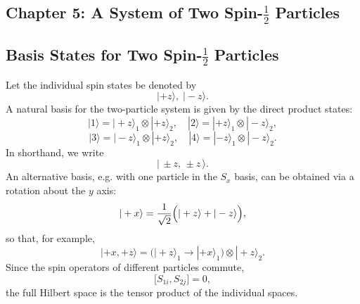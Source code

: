\documentclass[twocolumn]{article}
\begin{document}
\begin{spacing}{1}
\section{Chapter 5: A System of Two Spin-\(\frac{1}{2}\) Particles}

\subsection{Basis States for Two Spin-\(\frac{1}{2}\) Particles}
Let the individual spin states be denoted by
\[
|+z\rangle,\;|-z\rangle.
\]
A natural basis for the two-particle system is given by the direct product states:
\[
|1\rangle=|+z\rangle_1\otimes|+z\rangle_2,\quad
|2\rangle=|+z\rangle_1\otimes|-z\rangle_2,
\]
\[
|3\rangle=|-z\rangle_1\otimes|+z\rangle_2,\quad
|4\rangle=|-z\rangle_1\otimes|-z\rangle_2.
\]
In shorthand, we write
\[
|\,\pm z,\,\pm z\,\rangle.
\]
An alternative basis, e.g. with one particle in the \(S_x\) basis, can be obtained via a rotation about the \(y\) axis:
\[
|+x\rangle=\frac{1}{\sqrt{2}}\Bigl(|+z\rangle+|-z\rangle\Bigr),
\]
so that, for example,
\[
|+x,+z\rangle = \bigl(|+z\rangle_1\to|+x\rangle_1\bigr)\otimes|+z\rangle_2.
\]
Since the spin operators of different particles commute,
\[
\bigl[S_{1i},S_{2j}\bigr]=0,
\]
the full Hilbert space is the tensor product of the individual spaces.


\end{spacing}
\end{document}
